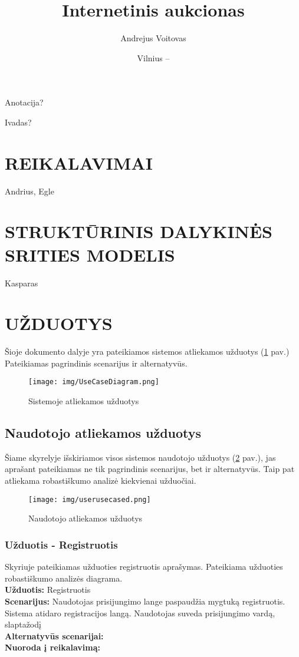 \documentclass{VUMIFPSkursinis}
\title{Internetinis aukcionas}
\author{Andrejus Voitovas}
\date{Vilnius – \the\year}
\begin{document}
\maketitle
\cleardoublepage{}
\setcounter{page}{2}
Anotacija?
\newpage
\tableofcontents

Ivadas?
\newpage
\section{REIKALAVIMAI}
Andrius, Egle
\newpage
\section{STRUKTŪRINIS DALYKINĖS SRITIES MODELIS}
Kasparas
\newpage
\section{UŽDUOTYS}
Šioje dokumento dalyje yra pateikiamos sistemos atliekamos užduotys  (\ref{fig:usecase} pav.) Pateikiamas pagrindinis scenarijus ir alternatyvūs.\\
\begin{figure}[H]
\centering
\texttt{[image: img/UseCaseDiagram.png]}
\label{fig:usecase}
\caption{Sistemoje atliekamos užduotys}
\end{figure}

\subsection{Naudotojo atliekamos užduotys}
Šiame skyrelyje išskiriamos visos sistemos naudotojo užduotys (\ref{fig:usercd} pav.), jas aprašant pateikiamas ne tik pagrindinis scenarijus, bet ir alternatyvūs. Taip pat atliekama robastiškumo analizė kiekvienai užduočiai.

\begin{figure}[H]
\centering
\texttt{[image: img/userusecased.png]}
\label{fig:usercd}
\caption{Naudotojo atliekamos užduotys}
\end{figure}

\subsubsection{Užduotis - Registruotis}
Skyriuje pateikiamas užduoties registruotis aprašymas. Pateikiama užduoties robastiškumo analizės diagrama.\\
\textbf{Užduotis:}  Registruotis \\
\textbf{Scenarijus:} Naudotojas prisijungimo lange paspaudžia mygtuką registruotis. Sistema atidaro registracijos langą. Naudotojas suveda prisijungimo vardą, slaptažodį  \\
\textbf{Alternatyvūs scenarijai:} \\
\textbf{Nuoroda į reikalavimą: } 


\newpage

\end{document}
